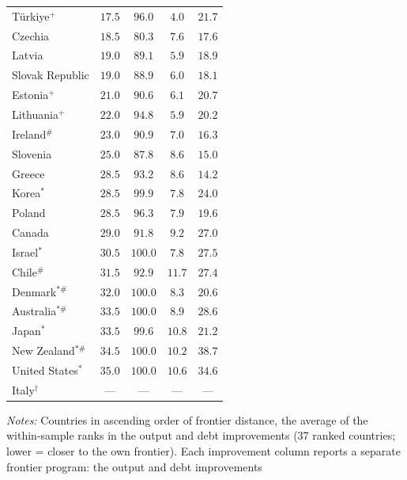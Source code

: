 \documentclass[12pt, a4paper]{article}
\begin{document}
\begin{table}[H]
\begin{tabular}{lc cc !{\vrule width 0.4pt} c}
T\"urkiye\(^{+}\)         & $17.5$ & $96.0$  & $4.0$  & $21.7$ \\
Czechia                   & $18.5$ & $80.3$  & $7.6$  & $17.6$ \\
Latvia                    & $19.0$ & $89.1$  & $5.9$  & $18.9$ \\
Slovak Republic           & $19.0$ & $88.9$  & $6.0$  & $18.1$ \\
Estonia\(^{+}\)           & $21.0$ & $90.6$  & $6.1$  & $20.7$ \\
Lithuania\(^{+}\)         & $22.0$ & $94.8$  & $5.9$  & $20.2$ \\
Ireland\(^{\#}\)          & $23.0$ & $90.9$  & $7.0$  & $16.3$ \\
Slovenia                  & $25.0$ & $87.8$  & $8.6$  & $15.0$ \\
Greece                    & $28.5$ & $93.2$  & $8.6$  & $14.2$ \\
Korea\(^{*}\)             & $28.5$ & $99.9$  & $7.8$  & $24.0$ \\
Poland                    & $28.5$ & $96.3$  & $7.9$  & $19.6$ \\
Canada                    & $29.0$ & $91.8$  & $9.2$  & $27.0$ \\
Israel\(^{*}\)            & $30.5$ & $100.0$ & $7.8$  & $27.5$ \\
Chile\(^{\#}\)            & $31.5$ & $92.9$  & $11.7$ & $27.4$ \\
Denmark\(^{*\#}\)         & $32.0$ & $100.0$ & $8.3$  & $20.6$ \\
Australia\(^{*\#}\)       & $33.5$ & $100.0$ & $8.9$  & $28.6$ \\
Japan\(^{*}\)             & $33.5$ & $99.6$  & $10.8$ & $21.2$ \\
New Zealand\(^{*\#}\)     & $34.5$ & $100.0$ & $10.2$ & $38.7$ \\
United States\(^{*}\)     & $35.0$ & $100.0$ & $10.6$ & $34.6$ \\
\midrule
Italy\(^{\dagger}\)       & ---    & ---     & ---    & ---    \\
\bottomrule
\end{tabular}
\vspace{0.15cm}
\begin{minipage}{0.95\textwidth}
\scriptsize \textit{Notes:} Countries in ascending order of frontier distance,
the average of the within-sample ranks in the output and debt improvements
(37 ranked countries; lower = closer to the own frontier). Each improvement
column reports a separate frontier program: the output and debt improvements

\end{minipage}
\end{table}
\end{document}
